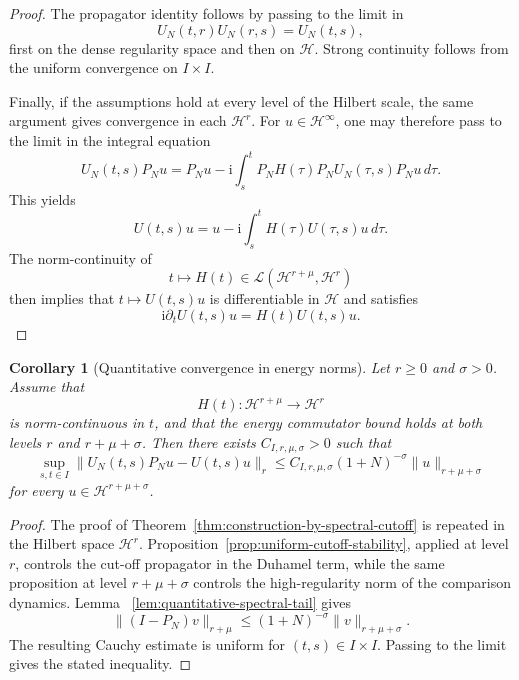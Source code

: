 \documentclass[11pt]{amsart}
\theoremstyle{plain}
\newtheorem{corollary}[theorem]{Corollary}
\theoremstyle{definition}
\theoremstyle{remark}
\newcommand{\Hilb}{\mathcal H}
\newcommand{\ii}{\mathrm i}
\begin{document}
\begin{proof}
The propagator identity follows by passing to the limit in
\[
U_{N}(t,r)U_{N}(r,s)=U_{N}(t,s),
\]
first on the dense regularity space and then on \(\Hilb\).
Strong continuity follows from the uniform convergence on \(I\times I\).

Finally, if the assumptions hold at every level of the Hilbert scale, the
same argument gives convergence in each \(\Hilb^{r}\). For
\(u\in\Hilb^{\infty}\), one may therefore pass to the limit in the
integral equation
\[
U_{N}(t,s)P_{N}u
=
P_{N}u
-
\ii
\int_{s}^{t}
P_{N}H(\tau)P_{N}
U_{N}(\tau,s)P_{N}u\,d\tau.
\]
This yields
\[
U(t,s)u
=
u
-
\ii
\int_{s}^{t}H(\tau)U(\tau,s)u\,d\tau.
\]
The norm-continuity of
\[
t\longmapsto H(t)\in
\mathcal{L}(\Hilb^{r+\mu},\Hilb^{r})
\]
then implies that \(t\mapsto U(t,s)u\) is differentiable in
\(\Hilb\) and satisfies
\[
\ii\partial_{t}U(t,s)u=H(t)U(t,s)u.
\]
\end{proof}
\begin{corollary}[Quantitative convergence in energy norms]
\label{cor:quantitative-energy-convergence}
Let \(r\geq0\) and \(\sigma>0\). Assume that
\[
H(t):\Hilb^{r+\mu}\longrightarrow\Hilb^r
\]
is norm-continuous in \(t\), and that the energy commutator bound holds
at both levels \(r\) and \(r+\mu+\sigma\). Then there exists
\(C_{I,r,\mu,\sigma}>0\) such that
\[
\sup_{s,t\in I}
\|U_N(t,s)P_Nu-U(t,s)u\|_r
\leq
C_{I,r,\mu,\sigma}(1+N)^{-\sigma}
\|u\|_{r+\mu+\sigma}
\]
for every \(u\in\Hilb^{r+\mu+\sigma}\).
\end{corollary}

\begin{proof}
The proof of Theorem~\ref{thm:construction-by-spectral-cutoff} is
repeated in the Hilbert space \(\Hilb^r\).
Proposition~\ref{prop:uniform-cutoff-stability}, applied at level \(r\),
controls the cut-off propagator in the Duhamel term, while the same
proposition at level \(r+\mu+\sigma\) controls the high-regularity norm
of the comparison dynamics.  Lemma~
\ref{lem:quantitative-spectral-tail} gives
\[
\|(I-P_N)v\|_{r+\mu}
\leq
(1+N)^{-\sigma}\|v\|_{r+\mu+\sigma}.
\]
The resulting Cauchy estimate is uniform for
\((t,s)\in I\times I\). Passing to the limit gives the stated
inequality.
\end{proof}
\end{document}
